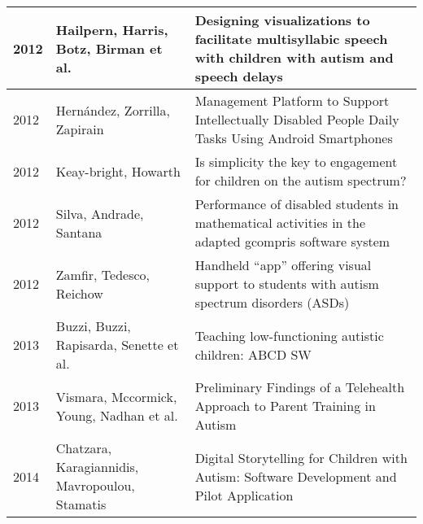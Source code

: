 \documentclass[utf8,english]{gradu3}
\begin{document}
\begin{longtable}{|>{\scriptsize}l|>{\scriptsize}p{3cm}|>{\scriptsize}p{10.4cm}|}
  2012          & Hailpern, Harris, Botz, Birman et al.                        & Designing visualizations to facilitate multisyllabic speech with children with autism and speech delays                                                                                                                        \\ \hline
  2012          & Hernández, Zorrilla, Zapirain                                & Management Platform to Support Intellectually Disabled People Daily Tasks Using Android Smartphones                                                                                                                            \\ \hline
  2012          & Keay-bright, Howarth                                         & Is simplicity the key to engagement for children on the autism spectrum?                                                                                                                                                       \\ \hline
  2012          & Silva, Andrade, Santana                                      & Performance of disabled students in mathematical activities in the adapted gcompris software system                                                                                                                            \\ \hline
  2012          & Zamfir, Tedesco, Reichow                                     & Handheld “app” offering visual support to students with autism spectrum disorders (ASDs)                                                                                                                                       \\ \hline
  2013          & Buzzi, Buzzi, Rapisarda, Senette et al.                      & Teaching low-functioning autistic children: ABCD SW                                                                                                                                                                            \\ \hline
  2013          & Vismara, Mccormick, Young, Nadhan et al.                     & Preliminary Findings of a Telehealth Approach to Parent Training in Autism                                                                                                                                                     \\ \hline
  2014          & Chatzara, Karagiannidis, Mavropoulou, Stamatis               & Digital Storytelling for Children with Autism: Software Development and Pilot Application                                                                                                                                      \\ \hline

\end{longtable}
\end{document}
